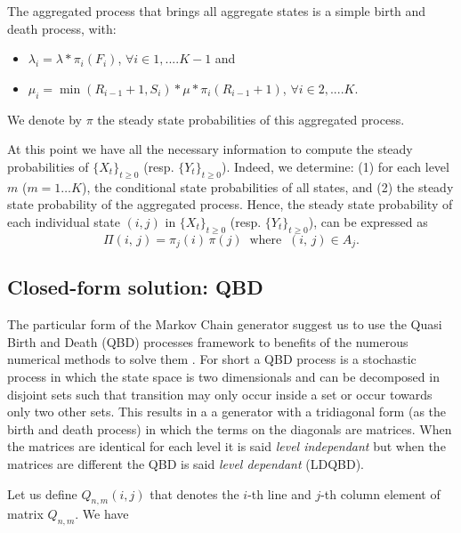\documentclass[conference]{IEEEtran}
\begin{document}
The aggregated process that brings all aggregate states  is a simple birth and death process, with:

\begin{itemize}
\item $\lambda_{i}=\lambda*\pi_{i}(F_{i})$,\;\; $\forall i \in {1,....K-1}$ and

\item $\mu_{i}=\min(R_{i-1}+1,S_i)*\mu*\pi_{i}(R_{i-1}+1)$,\; $\forall i \in {2,....K}$.
\end{itemize}
We denote by $\pi$ the steady state probabilities of this aggregated process.


At this point we have all the necessary information to compute the steady probabilities of $\{X_{t}\}_{t \geq 0}$ (resp. $\{Y_{t}\}_{t \geq 0}$). Indeed, we determine: (1) for each level $m$ ($m=1\ldots K$), the conditional state probabilities of all states, and (2) the steady state probability of the aggregated process. Hence,  the steady state probability of each individual state $(i,j)$ in $\{X_{t}\}_{t \geq 0}$ (resp. $\{Y_{t}\}_{t \geq 0}$),  can be expressed as
\begin{equation*}
\Pi(i,\,j)=\pi_j(i)\,\pi(j)\;\; \mbox{where} \;\; (i,\,j)\in A_j.
\end{equation*}


\subsection{Closed-form solution:  QBD}

The particular form of the Markov Chain generator suggest us to use the Quasi Birth and Death (QBD) processes framework to benefits of the numerous
numerical methods to solve them \cite{Neuts1981}. For short a QBD process is a stochastic process in which the state space is two dimensionals and can 
be decomposed in disjoint sets such that transition may only occur inside a set or occur towards only two other sets.
This results in a a generator with a tridiagonal form (as the birth and death process) in which the terms on the diagonals are matrices.
When the matrices are identical for each level it is said \emph{level independant} but when the matrices are different  the QBD
is said \emph{level dependant} (LDQBD).


Let us define $Q_{n,m}(i,j)$ that denotes the $i$-th line and $j$-th column element of matrix $Q_{n,m}$. We have
\end{document}
